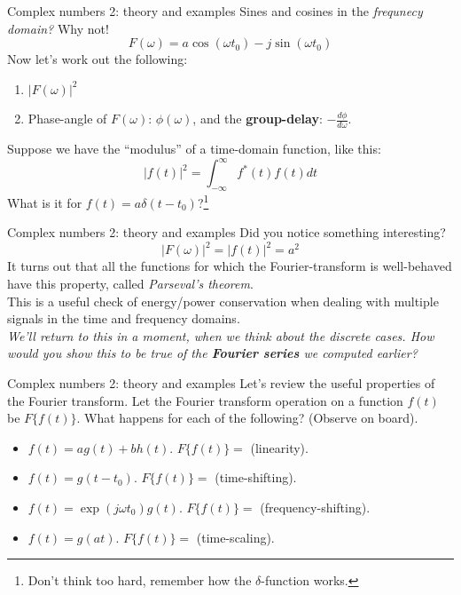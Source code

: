 \documentclass{beamer}
\begin{document}
\begin{frame}[fragile]{Complex numbers 2: theory and examples}
\small
Sines and cosines in the \textit{frequnecy domain?}  Why not!
\begin{equation}
F(\omega) = a \cos(\omega t_0) - j\sin(\omega t_0)
\end{equation}
Now let's work out the following:
\begin{enumerate}
\item $|F(\omega)|^2$
\item Phase-angle of $F(\omega)$: $\phi(\omega)$, and the \textbf{\alert{group-delay}}: $-\frac{d\phi}{d\omega}$.
\end{enumerate}
Suppose we have the ``modulus'' of a time-domain function, like this:
\begin{equation}
|f(t)|^2 = \int_{-\infty}^{\infty} f^*(t) f(t) dt
\end{equation}
What is it for $f(t) = a\delta(t-t_0)$?\footnote{Don't think too hard, remember how the $\delta$-function works.}
\end{frame}

\begin{frame}[fragile]{Complex numbers 2: theory and examples}
\small
Did you notice something interesting?
\begin{equation}
|F(\omega)|^2 = |f(t)|^2 = a^2
\end{equation}
It turns out that all the functions for which the Fourier-transform is well-behaved have this property, called \textit{Parseval's theorem}. \\ \vspace{0.5cm}
This is a useful check of energy/power conservation when dealing with multiple signals in the time and frequency domains. \\ \vspace{0.5cm}
\textit{We'll return to this in a moment, when we think about the discrete cases.  How would you show this to be true of the \textbf{Fourier series} we computed earlier?}
\end{frame}

\begin{frame}[fragile]{Complex numbers 2: theory and examples}
\small
Let's review the useful properties of the Fourier transform.  Let the Fourier transform operation on a function $f(t)$ be $F\lbrace f(t) \rbrace$.  What happens for each of the following? (Observe on board).
\begin{itemize}
\item $f(t) = a g(t) + b h(t)$.  $F\lbrace f(t) \rbrace = $ (linearity).
\item $f(t) = g(t-t_0)$.  $F\lbrace f(t) \rbrace = $ (time-shifting).
\item $f(t) = \exp(j\omega t_0)g(t)$.  $F\lbrace f(t) \rbrace = $ (frequency-shifting).
\item $f(t) = g(at)$.  $F\lbrace f(t) \rbrace = $ (time-scaling).
\end{itemize}
\end{frame}
\end{document}
